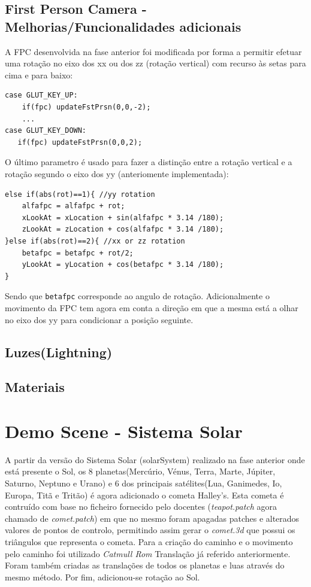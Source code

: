 \documentclass{article}
\begin{document}
\subsection{First Person Camera - Melhorias/Funcionalidades adicionais}
A FPC desenvolvida na fase anterior foi modificada por forma a permitir efetuar uma rotação no eixo dos xx ou dos zz (rotação vertical) com recurso às setas para cima e para baixo:
\begin{verbatim}
case GLUT_KEY_UP:
    if(fpc) updateFstPrsn(0,0,-2);
    ...
case GLUT_KEY_DOWN:
   if(fpc) updateFstPrsn(0,0,2);
\end{verbatim}

O último parametro é usado para fazer a distinção entre a rotação vertical e a rotação segundo o eixo dos yy (anteriomente implementada):
\begin{verbatim}
else if(abs(rot)==1){ //yy rotation 
    alfafpc = alfafpc + rot;
    xLookAt = xLocation + sin(alfafpc * 3.14 /180);
    zLookAt = zLocation + cos(alfafpc * 3.14 /180);
}else if(abs(rot)==2){ //xx or zz rotation 
    betafpc = betafpc + rot/2;
    yLookAt = yLocation + cos(betafpc * 3.14 /180);
}
\end{verbatim}
Sendo que \texttt{betafpc} corresponde ao angulo de rotação. Adicionalmente o movimento da FPC tem agora em conta a direção em que a mesma está a olhar no eixo dos yy para condicionar a posição seguinte.

\subsection{Luzes(Lightning)}

\subsection{Materiais}

\section{Demo Scene - Sistema Solar}
A partir da versão do Sistema Solar (solarSystem) realizado na fase anterior onde está presente o Sol, os 8 planetas(Mercúrio, Vénus, Terra, Marte, Júpiter, Saturno, Neptuno e Urano) e 6 dos principais satélites(Lua, Ganimedes, Io, Europa, Titã e Tritão) é agora adicionado o cometa Halley's. Esta cometa é contruído com base no ficheiro fornecido pelo docentes (\textit{teapot.patch} agora chamado de \textit{comet.patch}) em que no mesmo foram apagadas patches e alterados valores de pontos de controlo, permitindo assim gerar o \textit{comet.3d} que possui os triângulos que representa o cometa. Para a criação do caminho e o movimento pelo caminho foi utilizado \textit{Catmull Rom} Translação já referido anteriormente. Foram também criadas as translações de todos os planetas e luas através do mesmo método. Por fim, adicionou-se rotação ao Sol.
\end{document}
